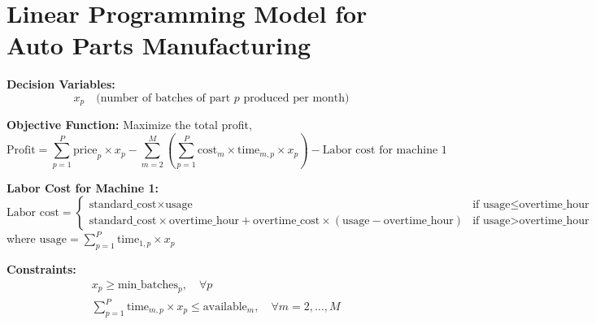 \documentclass{article}
\begin{document}
\section*{Linear Programming Model for Auto Parts Manufacturing}

\textbf{Decision Variables:}
\[
x_p \quad \text{(number of batches of part } p \text{ produced per month)}
\]

\textbf{Objective Function:}
Maximize the total profit, 
\[
\text{Profit} = \sum_{p=1}^{P} \text{price}_{p} \times x_p - \sum_{m=2}^{M} \left(\sum_{p=1}^{P} \text{cost}_{m} \times \text{time}_{m,p} \times x_p \right) - \text{Labor cost for machine 1}
\]

\textbf{Labor Cost for Machine 1:}
\[
\text{Labor cost} = 
\begin{cases} 
\text{standard\_cost} \times \text{usage} & \text{if } \text{usage} \leq \text{overtime\_hour}\\
\text{standard\_cost} \times \text{overtime\_hour} + \text{overtime\_cost} \times (\text{usage} - \text{overtime\_hour}) & \text{if } \text{usage} > \text{overtime\_hour}
\end{cases}
\]
where \(\text{usage} = \sum_{p=1}^{P} \text{time}_{1,p} \times x_p\)

\textbf{Constraints:}
\begin{align*}
& x_p \geq \text{min\_batches}_{p}, \quad \forall p \\
& \sum_{p=1}^{P} \text{time}_{m,p} \times x_p \leq \text{available}_{m}, \quad \forall m = 2, \ldots, M
\end{align*}
\end{document}
